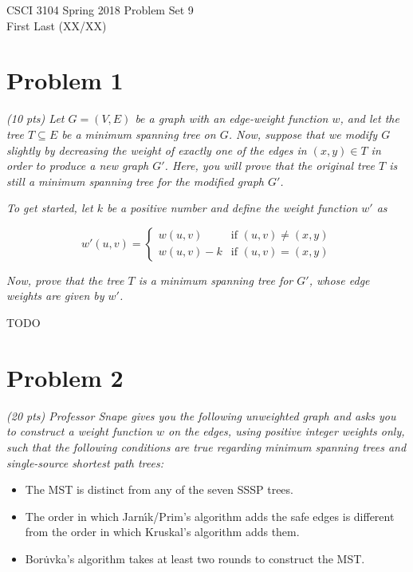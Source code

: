 \documentclass[12pt]{article} \setlength{\oddsidemargin}{0in}
\begin{document}
\noindent CSCI 3104 Spring 2018 \hfill Problem Set 9\\
First Last (XX/XX)

\graphicspath{ {images/} }

\hrulefill

{\selectfont}

\section*{Problem 1}

\textit{(10 pts) Let $G = (V, E)$ be a graph with an edge-weight function $w$, and let the tree
$T \subseteq E$ be a minimum spanning tree on $G$. Now, suppose that we modify $G$ slightly by
decreasing the weight of exactly one of the edges in $(x, y) \in T$ in order to produce a
new graph $G'$. Here, you will prove that the original tree $T$ is still a minimum spanning
tree for the modified graph $G'$.}

\textit{To get started, let $k$ be a positive number and define the weight function $w'$ as}

$$
w'(u,v) =
  \begin{cases}
    w(u,v) & \text{if $(u,v) \ne (x,y)$} \\
    w(u,v)-k & \text{if $(u,v) = (x,y)$}
  \end{cases}
  $$

\textit{Now, prove that the tree $T$ is a minimum spanning tree for $G'$, whose edge weights are
given by $w'$.}

TODO

\newpage

\section*{Problem 2}

\textit{(20 pts) Professor Snape gives you the following unweighted graph and asks you to
construct a weight function $w$ on the edges, using positive integer weights only, such
that the following conditions are true regarding minimum spanning trees and single-source shortest path trees:}
\begin{itemize}
\item The MST is distinct from any of the seven SSSP trees.
\item The order in which Jarnı́k/Prim’s algorithm adds the safe edges is different from the order in which Kruskal’s algorithm adds them.
\item Boru̇vka’s algorithm takes at least two rounds to construct the MST.
\end{itemize}
\end{document}
